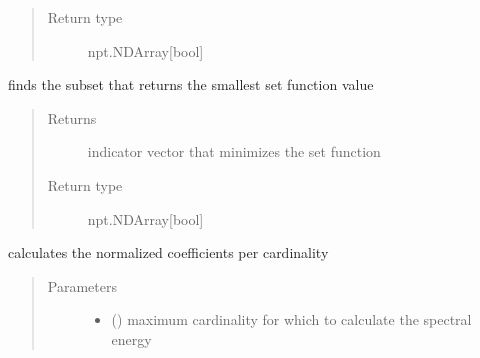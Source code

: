 \documentclass[letterpaper,10pt,english]{sphinxmanual}
\begin{document}
\begin{fulllineitems}
\begin{fulllineitems}
\begin{quote}
\begin{description}
\item[{Return type}] \leavevmode
\sphinxAtStartPar
npt.NDArray{[}bool{]}

\end{description}\end{quote}

\end{fulllineitems}


\begin{fulllineitems}
\label{\detokenize{setFTs:setFTs.setfunctions.WrapSignal.min}}
\sphinxAtStartPar
finds the subset that returns the smallest set function value
\begin{quote}\begin{description}
\item[{Returns}] \leavevmode
\sphinxAtStartPar
indicator vector that minimizes the set function

\item[{Return type}] \leavevmode
\sphinxAtStartPar
npt.NDArray{[}bool{]}

\end{description}\end{quote}

\end{fulllineitems}


\begin{fulllineitems}
\label{\detokenize{setFTs:setFTs.setfunctions.WrapSignal.spectral_energy}}
\sphinxAtStartPar
calculates the normalized coefficients per cardinality
\begin{quote}\begin{description}
\item[{Parameters}] \leavevmode\begin{itemize}
\item {} 
\sphinxAtStartPar
{} () \textendash{} maximum cardinality for which to calculate the spectral energy


\end{itemize}
\end{description}
\end{quote}
\end{fulllineitems}
\end{fulllineitems}
\end{document}
